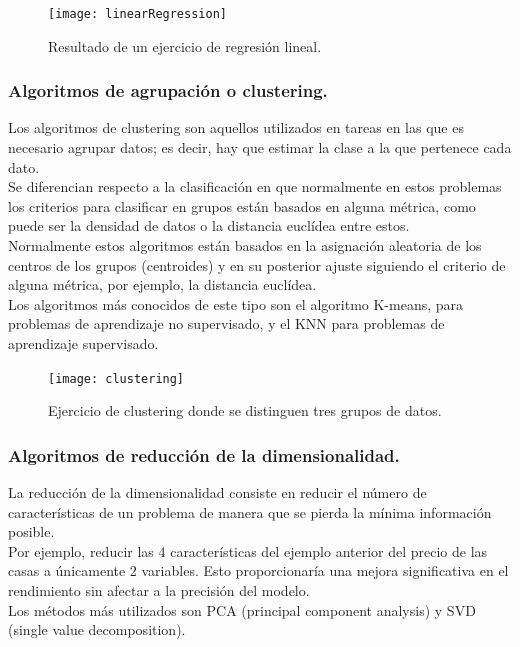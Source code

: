 \documentclass[a4paper,11pt]{article}
\begin{document}
\begin{figure}[H]
\centering
\texttt{[image: linearRegression]}
\caption{Resultado de un ejercicio de regresión lineal.}
\end{figure}

\subsubsection{Algoritmos de agrupación o clustering.}
Los algoritmos de clustering son aquellos utilizados en tareas en las que es necesario agrupar datos; es decir, hay que estimar la clase a la que pertenece cada dato. \\

\noindent
Se diferencian respecto a la clasificación en que normalmente en estos problemas los criterios para clasificar en grupos están basados en alguna métrica, como puede ser la densidad de datos o la distancia euclídea entre estos.\\

\noindent
Normalmente estos algoritmos están basados en la asignación aleatoria de los centros de los grupos (centroides) y en su posterior ajuste siguiendo el criterio de alguna métrica, por ejemplo, la distancia euclídea. \\

\noindent
Los algoritmos más conocidos de este tipo son el algoritmo K-means, para problemas de aprendizaje no supervisado, y el KNN para problemas de aprendizaje supervisado.
\begin{figure}[H]
\centering
\texttt{[image: clustering]}
\caption{Ejercicio de clustering donde se distinguen tres grupos de datos.}
\end{figure}


\subsubsection{Algoritmos de reducción de la dimensionalidad.}
La reducción de la dimensionalidad consiste en reducir el número de características de un problema de manera que se pierda la mínima información posible.\\

\noindent
Por ejemplo, reducir las 4 características del ejemplo anterior del precio de las casas a únicamente 2 variables. Esto proporcionaría una mejora significativa en el rendimiento sin afectar a la precisión del modelo.\\

\noindent
Los métodos más utilizados son PCA (principal component analysis) y SVD (single value decomposition).
\end{document}
